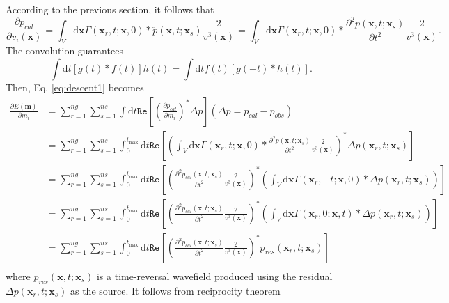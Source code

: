 According to the previous section, it follows that
\begin{equation}
\frac{\partial p_{cal}}{\partial v_i(\textbf{x})}
=\int_V \mathrm{d}\textbf{x}\Gamma(\textbf{x}_r,t;\textbf{x},0)*
\ddot{p}(\textbf{x},t;\textbf{x}_s)\frac{2}{v^3(\textbf{x})}
=\int_V \mathrm{d}\textbf{x}\Gamma(\textbf{x}_r,t;\textbf{x},0)*
\frac{\partial^2 p(\textbf{x},t;\textbf{x}_s)}{\partial t^2}\frac{2}{v^3(\textbf{x})}.
\end{equation}
The convolution guarantees
\begin{equation}
\int \mathrm{d}t [g(t)*f(t)]h(t)=\int \mathrm{d}t f(t)[g(-t)*h(t)].
\end{equation}
Then, Eq. \eqref{eq:descent1} becomes
\begin{equation}
\begin{split}
\frac{\partial E(\textbf{m})}{\partial m_i}
&=\sum_{r=1}^{ng}\sum_{s=1}^{ns}\int \mathrm{d}t\mathtt{Re} \left[\left(\frac{\partial p_{cal}}{\partial m_i}\right)^*\Delta p\right] (\Delta p=p_{cal}-p_{obs})\\
&=\sum_{r=1}^{ng}\sum_{s=1}^{ns}\int_{0}^{t_{\max}}\mathrm{d}t\mathtt{Re} \left[\left(\int_V \mathrm{d}\textbf{x}\Gamma(\textbf{x}_r,t;\textbf{x},0)*
\frac{\partial^2 p(\textbf{x},t;\textbf{x}_s)}{\partial t^2}\frac{2}{v^3(\textbf{x})}\right)^*\Delta p(\textbf{x}_r,t;\textbf{x}_s)\right]\\
&=\sum_{r=1}^{ng}\sum_{s=1}^{ns}\int_{0}^{t_{\max}}\mathrm{d}t\mathtt{Re} \left[\left(
\frac{\partial^2 p_{cal}(\textbf{x},t;\textbf{x}_s)}{\partial t^2}\frac{2}{v^3(\textbf{x})}\right)^*(\int_V \mathrm{d}\textbf{x}\Gamma(\textbf{x}_r,-t;\textbf{x},0)*\Delta p(\textbf{x}_r,t;\textbf{x}_s))\right]\\
&=\sum_{r=1}^{ng}\sum_{s=1}^{ns}\int_{0}^{t_{\max}}\mathrm{d}t\mathtt{Re} \left[\left(
\frac{\partial^2 p_{cal}(\textbf{x},t;\textbf{x}_s)}{\partial t^2}\frac{2}{v^3(\textbf{x})}\right)^*(\int_V \mathrm{d}\textbf{x}\Gamma(\textbf{x}_r,0;\textbf{x},t)*\Delta p(\textbf{x}_r,t;\textbf{x}_s))\right]\\
&=\sum_{r=1}^{ng}\sum_{s=1}^{ns}\int_{0}^{t_{\max}}\mathrm{d}t\mathtt{Re} \left[\left(
\frac{\partial^2 p_{cal}(\textbf{x},t;\textbf{x}_s)}{\partial t^2}\frac{2}{v^3(\textbf{x})}\right)^*p_{res}(\textbf{x}_r,t;\textbf{x}_s)\right]\\
\end{split}
\end{equation}
where $p_{res}(\textbf{x},t;\textbf{x}_s)$ is a time-reversal wavefield produced using the residual $\Delta p(\textbf{x}_r,t;\textbf{x}_s)$ as the source. It follows from reciprocity theorem
